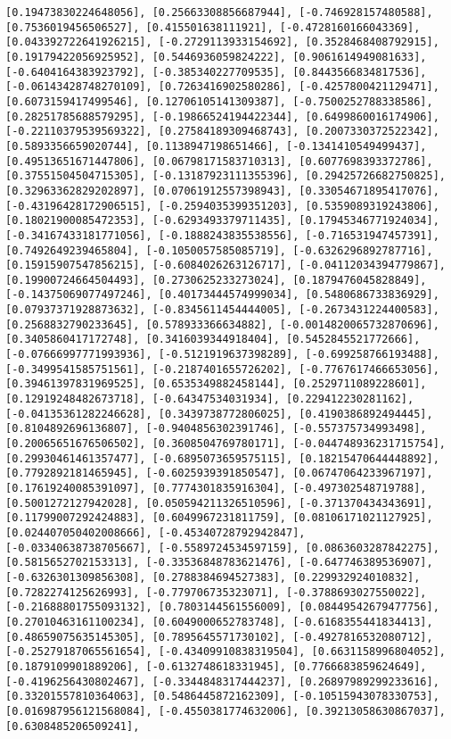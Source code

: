 \documentclass[11pt]{article}
\begin{document}
\begin{Verbatim}[commandchars=\\\{\}]
[0.19473830224648056], [0.25663308856687944], [-0.746928157480588], [0.7536019456506527], [0.415501638111921], [-0.4728160166043369], [0.043392722641926215], [-0.2729113933154692], [0.3528468408792915], [0.19179422056925952], [0.5446936059824222], [0.9061614949081633], [-0.6404164383923792], [-0.385340227709535], [0.8443566834817536], [-0.06143428748270109], [0.7263416902580286], [-0.4257800421129471], [0.6073159417499546], [0.12706105141309387], [-0.7500252788338586], [0.28251785688579295], [-0.19866524194422344], [0.6499860016174906], [-0.22110379539569322], [0.27584189309468743], [0.2007330372522342], [0.5893356659020744], [0.1138947198651466], [-0.1341410549499437], [0.49513651671447806], [0.06798171583710313], [0.6077698393372786], [0.37551504504715305], [-0.13187923111355396], [0.29425726682750825], [0.32963362829202897], [0.07061912557398943], [0.33054671895417076], [-0.43196428172906515], [-0.2594035399351203], [0.5359089319243806], [0.18021900085472353], [-0.6293493379711435], [0.17945346771924034], [-0.34167433181771056], [-0.1888243835538556], [-0.716531947457391], [0.7492649239465804], [-0.1050057585085719], [-0.6326296892787716], [0.15915907547856215], [-0.6084026263126717], [-0.04112034394779867], [0.19900724664504493], [0.2730625233273024], [0.1879476045828849], [-0.14375069077497246], [0.40173444574999034], [0.5480686733836929], [0.07937371928873632], [-0.8345611454444005], [-0.2673431224400583], [0.2568832790233645], [0.578933366634882], [-0.0014820065732870696], [0.3405860417172748], [0.3416039344918404], [0.5452845521772666], [-0.07666997771993936], [-0.5121919637398289], [-0.699258766193488], [-0.3499541585751561], [-0.2187401655726202], [-0.7767617466653056], [0.39461397831969525], [0.6535349882458144], [0.2529711089228601], [0.12919248482673718], [-0.64347534031934], [0.229412230281162], [-0.04135361282246628], [0.3439738772806025], [0.4190386892494445], [0.8104892696136807], [-0.9404856302391746], [-0.557375734993498], [0.20065651676506502], [0.3608504769780171], [-0.044748936231715754], [0.29930461461357477], [-0.6895073659575115], [0.18215470644448892], [0.7792892181465945], [-0.6025939391850547], [0.06747064233967197], [0.17619240085391097], [0.7774301835916304], [-0.497302548719788], [0.5001272127942028], [0.050594211326510596], [-0.371370434343691], [0.11799007292424883], [0.6049967231811759], [0.08106171021127925], [0.024407050402008666], [-0.45340728792942847], [-0.03340638738705667], [-0.5589724534597159], [0.0863603287842275], [0.5815652702153313], [-0.33536848783621476], [-0.647746389536907], [-0.6326301309856308], [0.2788384694527383], [0.229932924010832], [0.7282274125626993], [-0.779706735323071], [-0.3788693027550022], [-0.21688801755093132], [0.7803144561556009], [0.08449542679477756], [0.27010463161100234], [0.6049000652783748], [-0.6168355441834413], [0.48659075635145305], [0.7895645571730102], [-0.4927816532080712], [-0.25279187065561654], [-0.43409910838319504], [0.6631158996804052], [0.1879109901889206], [-0.6132748618331945], [0.7766683859624649], [-0.4196256430802467], [-0.3344848317444237], [0.26897989299233616], [0.33201557810364063], [0.5486445872162309], [-0.10515943078330753], [0.016987956121568084], [-0.4550381774632006], [0.39213058630867037], [0.6308485206509241], 
\end{Verbatim}
\end{document}

